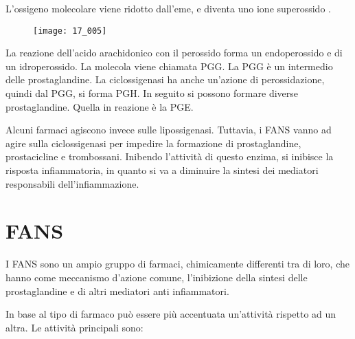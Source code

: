 L'ossigeno molecolare viene ridotto
dall'eme,
e diventa uno ione superossido .

\begin{figure}[H]
    \centering
\texttt{[image: 17\_005]}
\end{figure}

La reazione dell'acido arachidonico con il perossido forma un
endoperossido e di un idroperossido. La molecola viene chiamata
PGG. La PGG è un intermedio delle prostaglandine. La
ciclossigenasi ha anche un'azione di perossidazione, quindi dal
PGG, si forma PGH. In seguito si possono formare diverse
prostaglandine. Quella in reazione è la PGE.

Alcuni farmaci agiscono invece sulle lipossigenasi. Tuttavia, i FANS
vanno ad agire sulla ciclossigenasi per impedire la formazione di
prostaglandine, prostacicline e trombossani. Inibendo l'attività di
questo enzima, si inibisce la risposta infiammatoria, in quanto si va a
diminuire la sintesi dei mediatori responsabili dell'infiammazione.


\section{FANS}

I FANS sono un ampio gruppo di farmaci, chimicamente differenti tra di
loro, che hanno come meccanismo d'azione comune, l'inibizione della
sintesi delle prostaglandine e di altri mediatori anti infiammatori.

In base al tipo di farmaco può essere più accentuata un'attività
rispetto ad un altra. Le attività principali sono:

